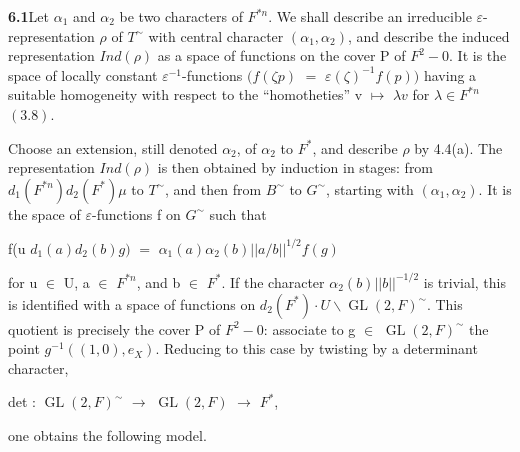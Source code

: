 \documentclass[10pt,a4paper]{article}
\begin{document}
\clearpage
{}
\label{d035-physical-028}
\par\medskip{}\par\smallskip
\par\noindent\textbf{6.1}\quad Let $\alpha{}_1$ and $\alpha{}_2$ be two characters of $F^{*n}$. We shall describe an irreducible $\varepsilon{}$-representation $\rho{}$ of $T^\sim$ with central character $(\alpha{}_1,\alpha{}_2)$, and describe the induced representation $Ind(\rho{})$ as a space of functions on the cover P of $F^2-{0}$. It is the space of locally constant $\varepsilon{}^{-1}$-functions $(f(\zeta{}p)$ $=$ $\varepsilon{}(\zeta{})^{-1}f(p))$ having a suitable homogeneity with respect to the ``homotheties'' v $\mapsto{}$ $\lambda{}v$ for $\lambda{}\in{}F^{*n}$ $(3.8)$.\par
\par Choose an extension, still denoted $\alpha{}_2$, of $\alpha{}_2$ to $F^*$, and describe $\rho{}$ by 4.4(a). The representation $Ind(\rho{})$ is then obtained by induction in stages: from $d_1(F^{*n})d_2(F^*)\mu{}$ to $T^\sim$, and then from $B^\sim$ to $G^\sim$, starting with $(\alpha{}_1,\alpha{}_2)$. It is the space of $\varepsilon{}$-functions f on $G^\sim$ such that\par
\par\smallskip\begin{center}\begin{minipage}{0.96\textwidth}\centering
f(u $d_1(a)d_2(b)g)$ $=$ $\alpha{}_1(a)\alpha{}_2(b)||a/b||^{1/2}f(g)$
\end{minipage}\end{center}\smallskip
\par for u $\in{}$ U, a $\in{}$ $F^{*n}$, and b $\in{}$ $F^*$. If the character $\alpha{}_2(b)||b||^{-1/2}$ is trivial, this is identified with a space of functions on $d_2(F^*)\cdot{}U\backslash \operatorname{GL}(2,F)^\sim$. This quotient is precisely the cover P of $F^2-{0}$: associate to g $\in{}$ $\operatorname{GL}(2,F)^\sim$ the point $g^{-1}((1,0),e_X)$. Reducing to this case by twisting by a determinant character,\par
\par det : $\operatorname{GL}(2,F)^\sim$ $\to{}$ $\operatorname{GL}(2,F)$ $\to{}$ $F^*$,\par
\par one obtains the following model.\par
\end{document}
